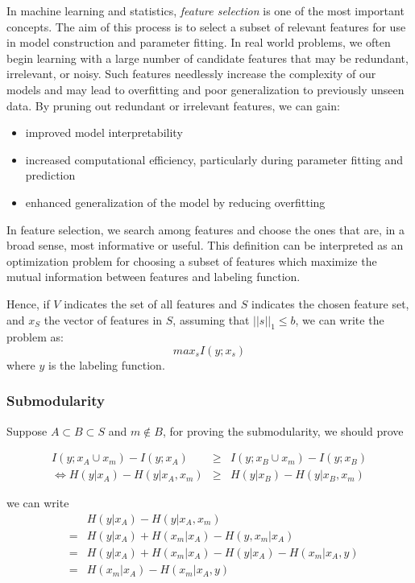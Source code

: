 In machine learning and statistics, \textit{feature selection} is one of the most important concepts. The aim of this process is to select a subset of relevant features for use in model construction and parameter fitting.  In real world problems, we often begin learning with a large number of candidate features that may be redundant, irrelevant, or noisy. Such features needlessly increase the complexity of our models and may lead to overfitting and poor generalization to previously unseen data. By pruning out redundant or irrelevant features, we can gain:
\begin{itemize}
\item improved model interpretability
\item increased computational efficiency, particularly during parameter fitting and prediction
\item enhanced generalization of the model by reducing overfitting
\end{itemize} 

In feature selection, we search among features and choose the ones that are, in a broad sense, most informative or useful. This definition can be interpreted as an optimization problem for choosing a subset of features which maximize the mutual information between features and labeling function.

Hence, if $V$ indicates the set of all features and $S$ indicates the chosen feature set, and $x_S$ the vector of features in $S$, assuming that $||s||_1 \leq b$, we can write the problem as:
\begin{equation*}
max_s I(y;x_s)
\end{equation*} 
where $y$ is the labeling function.

\subsubsection{Submodularity}

Suppose $A \subset B \subset S$ and $m \not \in B$, for proving the submodularity, we should prove

\begin{eqnarray}
I(y;x_A \cup x_m) - I(y;x_A) &\geq & I(y;x_B \cup x_m) - I(y;x_B) \nonumber \\
\Leftrightarrow H(y|x_A)-H(y|x_A,x_m) &\geq & H(y|x_B)-H(y|x_B,x_m) \label{f1}
\end{eqnarray}
  
 we can write
\begin{eqnarray} 
	&&H(y|x_A)-H(y|x_A,x_m) \nonumber \\
	&=&H(y|x_A)+ H(x_m|x_A)-H(y,x_m|x_A)\nonumber \\
	&=&H(y|x_A)+ H(x_m|x_A) -H(y|x_A) - H(x_m|x_A,y)\nonumber \\
	&=& H(x_m|x_A)- H(x_m|x_A,y) \label{f2}
\end{eqnarray} 

